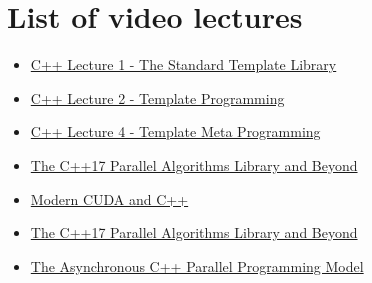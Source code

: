 \documentclass[11pt,fleqn]{book} %
\begin{document}
\cleardoublepage %
{}
\listoffigures


\chapter*{List of video lectures}


\begin{itemize}
\item \href{https://www.youtube.com/watch?v=asGZTCR53KY&list=PL7vEgTL3FalY2eBxud1wsfz8OKvE9sd_z}{C++ Lecture 1 - The Standard Template Library}
\item \href{https://www.youtube.com/watch?v=iU3wsiJ5mts}{C++ Lecture 2 - Template Programming }
\item \href{https://www.youtube.com/watch?v=6PWUByLZO0g}{C++ Lecture 4 - Template Meta Programming}
\item \href{https://www.youtube.com/watch?v=Vck6kzWjY88}{The C++17 Parallel Algorithms Library and
Beyond}
\item \href{https://youtu.be/5vr7ItjyIH8}{Modern CUDA and C++}
\item \href{https://www.youtube.com/watch?v=Vck6kzWjY88}{The C++17 Parallel Algorithms Library and
Beyond}
\item \href{https://www.youtube.com/watch?v=js-e8xAMd1s}{The Asynchronous C++ Parallel Programming Model}
\end{itemize}
\end{document}
